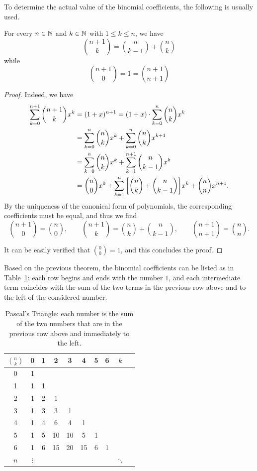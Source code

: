 To determine the actual value of the binomial coefficients, the following is
usually used.
  
\begin{theorem}
\mymark{*}%
\label{th:tartaglia}%
For every $n\in {\mathbb N}$ and $k \in {\mathbb N}$ with $1 \le k \le n$, we have
\[
  {n+1 \choose k} =
      {n \choose k-1} + {n \choose k}
\]
while
\[
  {n+1 \choose 0} = 1 = {n+1 \choose n+1}
\]
\end{theorem}
  \begin{proof}
  Indeed, we have 
  \begin{align*}
    \sum_{k=0}^{n+1} {n+1 \choose k} x^k
    &= (1+x)^{n+1} 
    = (1+x)\cdot \sum_{k=0}^n {n \choose k} x^k \\
    &= \sum_{k=0}^n {n\choose k} x^k 
    + \sum_{k=0}^n {n\choose k} x^{k+1}\\
    &= \sum_{k=0}^n {n\choose k} x^k 
    + \sum_{k=1}^{n+1} {n\choose k-1} x^{k}\\
    &= {n\choose 0} x^0 
      + \sum_{k=1}^n {\left[ {n\choose k} + {n\choose k-1} \right]} x^k
      + {n \choose n} x^{n+1}.
    \end{align*}
  By the uniqueness of the canonical form of polynomials, 
  the corresponding coefficients must be equal, and thus 
  we find
  \[
  {n+1 \choose 0} = {n \choose 0}, \qquad 
  {n+1 \choose k} = {n \choose k} + {n \choose k-1}, \qquad 
  {n+1 \choose n+1} = {n \choose n}.
  \]

  It can be easily verified that  ${0 \choose 0} = 1$, 
  and this concludes the proof.
  \end{proof}
  
  Based on the previous theorem, the binomial coefficients can be
  listed as in Table~\ref{tab:binomiali}:
  each row begins and ends with the number $1$,
  and each intermediate term coincides with the sum of the
  two terms in the previous row above and
  to the left of the considered number.
  
  \begin{table}
  \begin{tabular}{c|ccccccccc}
  $\displaystyle{n \choose k}$& 0 & 1 & 2 & 3 & 4 & 5 & 6 & $k$ &\\ \hline
    0 & 1 &   &   &   &   &   &   & &\\
    1 & 1 & 1 &   &   &   &   &   & &\\
    2 & 1 & 2 & 1 &   &   &   &   & &\\
    3 & 1 & 3 & 3 & 1 &   &   &   & &\\
    4 & 1 & 4 & 6 & 4 & 1 &   &   & &\\
    5 & 1 & 5 & 10& 10& 5 & 1 &   & &\\
    6 & 1 & 6 & 15& 20& 15& 6 & 1 & &\\
  $n$ &$\vdots$&&   &   &   &   &   & $\ddots$ &
  \end{tabular}
  \caption{Pascal's Triangle:
  each number is the sum of the two numbers that are 
  in the previous row above and immediately to the left.}
  \label{tab:binomiali}
  \end{table}
  
